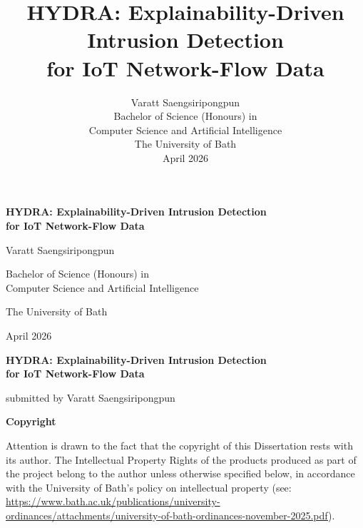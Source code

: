 \documentclass[12pt,a4paper]{report}
\title{\textbf{HYDRA: Explainability-Driven Intrusion Detection\\for IoT Network-Flow Data}}
\author{Varatt Saengsiripongpun\\[1em]
Bachelor of Science (Honours) in\\Computer Science and Artificial Intelligence\\[1em]
The University of Bath\\[1em]
April 2026}
\date{}
\begin{document}

\begin{titlepage}
\centering
\vspace*{\fill}
\vspace*{-2cm}
{\LARGE\bfseries HYDRA: Explainability-Driven Intrusion Detection\\[0.3em] for IoT Network-Flow Data\par}
\vspace{2cm}
{\Large Varatt Saengsiripongpun\par}
\vspace{1.5cm}
{\large Bachelor of Science (Honours) in\\Computer Science and Artificial Intelligence\par}
\vspace{1cm}
{\large The University of Bath\par}
\vspace{0.5cm}
{\large April 2026\par}
\vspace*{\fill}
\vspace*{\fill}
\end{titlepage}

\newpage
\thispagestyle{empty}

\begin{center}
{\LARGE\bfseries HYDRA: Explainability-Driven Intrusion Detection\\[0.3em] for IoT Network-Flow Data\par}
\vspace{1.5cm}
{\large submitted by Varatt Saengsiripongpun\par}
\end{center}

\vspace{1.5cm}

\noindent\textbf{Copyright}

\medskip

\noindent Attention is drawn to the fact that the copyright of this Dissertation rests with its author. The Intellectual Property Rights of the products produced as part of the project belong to the author unless otherwise specified below, in accordance with the University of Bath's policy on intellectual property (see: \url{https://www.bath.ac.uk/publications/university-ordinances/attachments/university-of-bath-ordinances-november-2025.pdf}).
\end{document}
